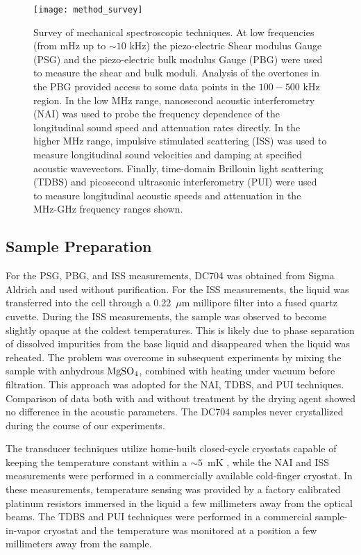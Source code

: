 \documentclass[reprint,showpacs,amsmath,amssymb,aip,jcp]{revtex4-1}
\begin{document}
\begin{figure}
  \centering
  \texttt{[image: method\_survey]}
  \caption{\label{fig:techniques_survey}Survey of mechanical
    spectroscopic techniques. At low frequencies (from mHz up to
    $\sim10$ kHz) the piezo-electric Shear modulus Gauge (PSG) and the
    piezo-electric bulk modulus Gauge (PBG) were used to measure the
    shear and bulk moduli. Analysis of the overtones in the PBG
    provided access to some data points in the $100-500$ kHz
    region. In the low MHz range, nanosecond acoustic interferometry
    (NAI) was used to probe the frequency dependence of the
    longitudinal sound speed and attenuation rates directly. In the
    higher MHz range, impulsive stimulated scattering (ISS) was used
    to measure longitudinal sound velocities and damping at specified
    acoustic wavevectors. Finally, time-domain Brillouin light
    scattering (TDBS) and picosecond ultrasonic interferometry (PUI)
    were used to measure longitudinal acoustic speeds and attenuation
    in the MHz-GHz frequency ranges shown.}
\end{figure}



\subsection{Sample Preparation}

For the PSG, PBG, and ISS measurements, DC704 was obtained from Sigma
Aldrich and used without purification. For the ISS measurements, the
liquid was transferred into the cell through a 0.22~$\mu$m millipore
filter into a fused quartz cuvette. During the ISS measurements, the
sample was observed to become slightly opaque at the coldest
temperatures. This is likely due to phase separation of dissolved
impurities from the base liquid and disappeared when the liquid was
reheated. The problem was overcome in subsequent experiments by mixing
the sample with anhydrous ${\rm MgSO_4}$, combined with heating under
vacuum before filtration. This approach was adopted for the NAI, TDBS,
and PUI techniques. Comparison of data both with and without treatment
by the drying agent showed no difference in the acoustic
parameters. The DC704 samples never crystallized during the course of
our experiments.

The transducer techniques utilize home-built closed-cycle cryostats
capable of keeping the temperature constant within a $\sim5$~mK
\cite{Igarashi2008a}, while the NAI and ISS measurements were
performed in a commercially available cold-finger cryostat. In these
measurements, temperature sensing was provided by a factory calibrated
platinum resistors immersed in the liquid a few millimeters away from
the optical beams. The TDBS and PUI techniques were performed in a
commercial sample-in-vapor cryostat and the temperature was monitored
at a position a few millimeters away from the sample.
\end{document}
